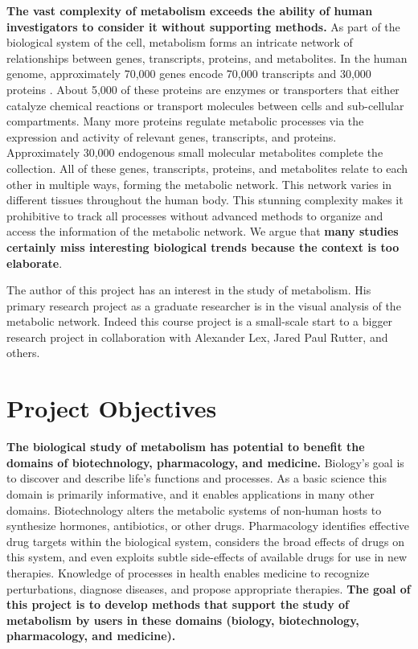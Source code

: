 \textbf{The vast complexity of metabolism exceeds the ability of human investigators to consider it without supporting methods.} 
As part of the biological system of the cell, metabolism forms an intricate network of relationships between genes, transcripts, proteins, and metabolites.
In the human genome, approximately 70,000 genes encode 70,000 transcripts and 30,000 proteins \supercite{zhang_forward_2015}.
About 5,000 of these proteins are enzymes or transporters \supercite{swainston_recon_2016, pornputtapong_human_2015, thiele_community-driven_2013} that either catalyze chemical reactions or transport molecules between cells and sub-cellular compartments.
Many more proteins regulate metabolic processes via the expression and activity of relevant genes, transcripts, and proteins.
Approximately 30,000 endogenous small molecular metabolites \supercite{wishart_hmdb_2013} complete the collection.
All of these genes, transcripts, proteins, and metabolites relate to each other in multiple ways, forming the metabolic network.
This network varies in different tissues throughout the human body.
This stunning complexity makes it prohibitive to track all processes without advanced methods to organize and access the information of the metabolic network.
We argue that \textbf{many studies certainly miss interesting biological trends because the context is too elaborate}.

The author of this project has an interest in the study of metabolism.
His primary research project as a graduate researcher is in the visual analysis of the metabolic network.
Indeed this course project is a small-scale start to a bigger research project in collaboration with Alexander Lex, Jared Paul Rutter, and others.

\section{Project Objectives}

\textbf{The biological study of metabolism has potential to benefit the domains of biotechnology, pharmacology, and medicine.}
Biology's goal is to discover and describe life's functions and processes.
As a basic science this domain is primarily informative, and it enables applications in many other domains.
Biotechnology alters the metabolic systems of non-human hosts to synthesize hormones, antibiotics, or other drugs.
Pharmacology identifies effective drug targets within the biological system, considers the broad effects of drugs on this system, and even exploits subtle side-effects of available drugs for use in new therapies.
Knowledge of processes in health enables medicine to recognize perturbations, diagnose diseases, and propose appropriate therapies.
\textbf{The goal of this project is to develop methods that support the study of metabolism by users in these domains (biology, biotechnology, pharmacology, and medicine).}

